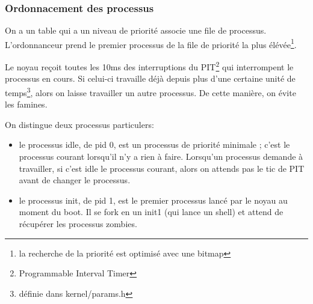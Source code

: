 \documentclass[10pt,a4paper]{beamer}
\begin{document}
\begin{frame}
  \frametitle{Ordonnacement des processus}
  On a un table qui a un niveau de priorité associe une file de processus. L'ordonnanceur prend le premier processus de la file de priorité la plus élévée\footnote{la recherche de la priorité est optimisé avec une bitmap}.

  Le noyau reçoit toutes les 10ms des interruptions du PIT\footnote{Programmable Interval Timer} qui interrompent le processus en cours. Si celui-ci travaille déjà depuis plus d'une certaine unité de temps\footnote{définie dans kernel/params.h}, alors on laisse travailler un autre processus. De cette manière, on évite les famines.

  On distingue deux processus particulers:
  \begin{itemize}
  \item le processus \textrm{idle}, de pid 0, est un processus de priorité minimale ; c'est le processus courant lorsqu'il n'y a rien à faire. Lorsqu'un processus demande à travailler, si c'est \textrm{idle} le processus courant, alors on attends pas le tic de PIT avant de changer le processus.
  \item le processus \textrm{init}, de pid 1, est le premier processus lancé par le noyau au moment du boot. Il se fork en un \textrm{init1} (qui lance un shell) et attend de récupérer les processus zombies.
  \end{itemize}

\end{frame}
\end{document}
